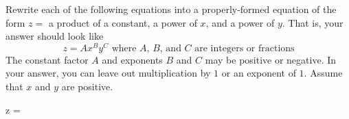 
Rewrite each of the following equations into a properly-formed equation of the form $z = $ a product of a constant, a power of $x$, and a power of $y$.
That is, your answer should look like
\begin{equation*}
 z = A x^B y^C \text{ where $A$, $B$, and $C$ are integers or fractions}
\end{equation*}
The constant factor $A$ and exponents $B$ and $C$ may be positive or negative.
In your answer, you can leave out multiplication by $1$ or an exponent of $1$.
Assume that $x$ and $y$ are positive.

\begin{multicols}{2}
 \begin{ProblemSet}[pencil space=2in]


  \begin{Problem}[pencil space=4in]
   \Large
   \begin{LeftEquation}
    z = 
   \end{LeftEquation}
  \end{Problem}

 \end{ProblemSet}
\end{multicols}


\newpage
{}

